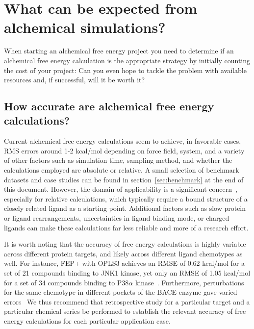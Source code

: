 \documentclass[9pt,bestpractices]{livecoms}
\begin{document}
\section{What can be expected from alchemical simulations?}
\label{sec:step0}


When starting an alchemical free energy project you need to determine if an alchemical free energy calculation is the appropriate strategy by initially counting the cost of your
project: Can you even hope to tackle the problem with available resources and, if successful, will it
be worth it?
\subsection{How accurate are alchemical free energy calculations?}

Current alchemical free energy calculations seem to achieve, in favorable cases, RMS errors around 1-2 kcal/mol depending on force field, system, and a variety of other factors such as simulation time, sampling method, and whether the calculations employed are absolute or relative. A small selection of benchmark datasets and case studies can be found in section~\ref{sec:benchmark} at the end of this document.
However, the domain of applicability is a significant concern~\cite{sherborne2016collaborating, cournia2017relative}, especially for relative calculations, which typically require a bound structure of a closely
related ligand as a starting point. Additional factors such as slow protein or ligand rearrangements, uncertainties in ligand binding mode, or charged ligands can make these calculations far less reliable and more of a research effort.

It is worth noting that the accuracy of free energy calculations is highly variable across different protein targets, and likely across different ligand chemotypes as well. For instance, FEP+ with OPLS3 achieves an RMSE of 0.62 kcal/mol for a set of 21 compounds binding to JNK1 kinase, yet only an RMSE of 1.05 kcal/mol for a set of 34 compounds binding to P38$\alpha$ kinase~\cite{harder2016opls3}. Furthermore, perturbations for the same chemotype in different pockets of the BACE enzyme gave varied errors~\cite{keranen2017acylguanidine}
We thus recommend that retrospective study for a particular target and a particular chemical series be performed to establish the relevant accuracy of free energy calculations for each particular application case.
%
\end{document}
